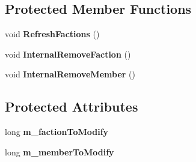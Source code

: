 \subsection*{Protected Member Functions}
\begin{DoxyCompactItemize}
\item 
\hypertarget{class_s_e_mod_a_p_i_internal_1_1_a_p_i_1_1_common_1_1_factions_manager_a95a483ea0536015bd2fd7b016059b79f}{}void {\bfseries Refresh\+Factions} ()\label{class_s_e_mod_a_p_i_internal_1_1_a_p_i_1_1_common_1_1_factions_manager_a95a483ea0536015bd2fd7b016059b79f}

\item 
\hypertarget{class_s_e_mod_a_p_i_internal_1_1_a_p_i_1_1_common_1_1_factions_manager_a9397b9aa0cecd7f5ddb47c984c5563c9}{}void {\bfseries Internal\+Remove\+Faction} ()\label{class_s_e_mod_a_p_i_internal_1_1_a_p_i_1_1_common_1_1_factions_manager_a9397b9aa0cecd7f5ddb47c984c5563c9}

\item 
\hypertarget{class_s_e_mod_a_p_i_internal_1_1_a_p_i_1_1_common_1_1_factions_manager_aa1f6d541571a6c1eb865334b1c6e4c59}{}void {\bfseries Internal\+Remove\+Member} ()\label{class_s_e_mod_a_p_i_internal_1_1_a_p_i_1_1_common_1_1_factions_manager_aa1f6d541571a6c1eb865334b1c6e4c59}

\end{DoxyCompactItemize}
\subsection*{Protected Attributes}
\begin{DoxyCompactItemize}
\item 
\hypertarget{class_s_e_mod_a_p_i_internal_1_1_a_p_i_1_1_common_1_1_factions_manager_aa706d6b6257f7e4c3bdddcc85ba9a46b}{}long {\bfseries m\+\_\+faction\+To\+Modify}\label{class_s_e_mod_a_p_i_internal_1_1_a_p_i_1_1_common_1_1_factions_manager_aa706d6b6257f7e4c3bdddcc85ba9a46b}

\item 
\hypertarget{class_s_e_mod_a_p_i_internal_1_1_a_p_i_1_1_common_1_1_factions_manager_a06e4c89ef5065dae7c54d116a985b4a5}{}long {\bfseries m\+\_\+member\+To\+Modify}\label{class_s_e_mod_a_p_i_internal_1_1_a_p_i_1_1_common_1_1_factions_manager_a06e4c89ef5065dae7c54d116a985b4a5}

\end{DoxyCompactItemize}
